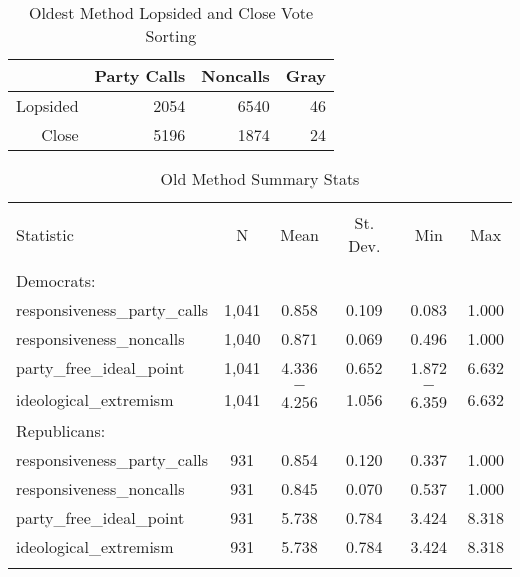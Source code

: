 \documentclass[12pt]{article}
\begin{document}
\begin{table}[ht]
	\caption{Oldest Method Lopsided and Close Vote Sorting}
	\centering
	\begin{tabular}{rrrr}
		\hline
		& Party Calls & Noncalls & Gray \\ 
		\hline
		Lopsided &  2054 & 6540 & 46 \\ 
		Close & 5196  & 1874 & 24 \\ 
		\hline
	\end{tabular}
\end{table}

\begin{table}[!htbp] \centering 
	\caption{Old Method Summary Stats} 
	\begin{tabular}{@{\extracolsep{5pt}}lccccc} 
		\\[-1.8ex]\hline 
		\hline \\[-1.8ex] 
		Statistic & \multicolumn{1}{c}{N} & \multicolumn{1}{c}{Mean} & \multicolumn{1}{c}{St. Dev.} & \multicolumn{1}{c}{Min} & \multicolumn{1}{c}{Max} \\ 
		\hline \\[-1.8ex] 
		Democrats: & & & & & \\
		\hline
		responsiveness\_party\_calls & 1,041 & 0.858 & 0.109 & 0.083 & 1.000 \\ 
		responsiveness\_noncalls & 1,040 & 0.871 & 0.069 & 0.496 & 1.000 \\ 
		party\_free\_ideal\_point & 1,041 & 4.336 & 0.652 & 1.872 & 6.632 \\ 
		ideological\_extremism & 1,041 & $-$4.256 & 1.056 & $-$6.359 & 6.632 \\ 
		\hline
		Republicans: & & & & & \\
		\hline 
		responsiveness\_party\_calls & 931 & 0.854 & 0.120 & 0.337 & 1.000 \\ 
		responsiveness\_noncalls & 931 & 0.845 & 0.070 & 0.537 & 1.000 \\ 
		party\_free\_ideal\_point & 931 & 5.738 & 0.784 & 3.424 & 8.318 \\ 
		ideological\_extremism & 931 & 5.738 & 0.784 & 3.424 & 8.318 \\ 
		\hline \\[-1.8ex] 
	\end{tabular} 
\end{table} 
\end{document}
